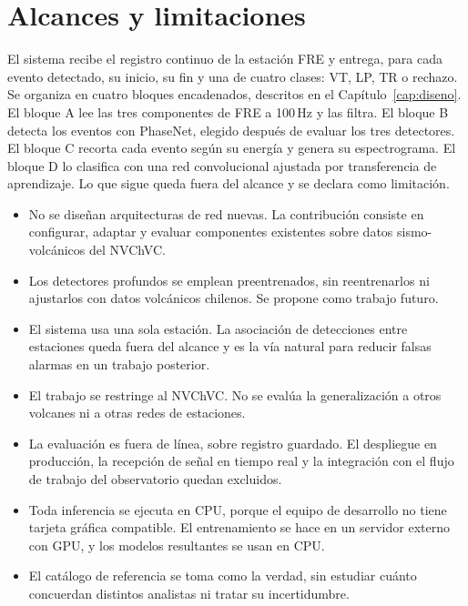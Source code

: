 \section{Alcances y limitaciones}
\label{sec:alcances}

El sistema recibe el registro continuo de la estación FRE y entrega, para cada
evento detectado, su inicio, su fin y una de cuatro clases: VT, LP, TR o
rechazo. Se organiza en cuatro bloques encadenados, descritos en el
Capítulo~\ref{cap:diseno}. El bloque A lee las tres componentes de FRE a
100\,Hz y las filtra. El bloque B detecta los eventos con PhaseNet, elegido
después de evaluar los tres detectores. El bloque C recorta cada evento según
su energía y genera su espectrograma. El bloque D lo clasifica con una red
convolucional ajustada por transferencia de aprendizaje. Lo que sigue queda
fuera del alcance y se declara como limitación.

\begin{itemize}
    \item No se diseñan arquitecturas de red nuevas. La contribución consiste en
    configurar, adaptar y evaluar componentes existentes sobre datos
    sismo-volcánicos del NVChVC.
    \item Los detectores profundos se emplean preentrenados, sin reentrenarlos
    ni ajustarlos con datos volcánicos chilenos. Se propone como trabajo futuro.
    \item El sistema usa una sola estación. La asociación de detecciones entre
    estaciones queda fuera del alcance y es la vía natural para reducir falsas
    alarmas en un trabajo posterior.
    \item El trabajo se restringe al NVChVC. No se evalúa la generalización a
    otros volcanes ni a otras redes de estaciones.
    \item La evaluación es fuera de línea, sobre registro guardado. El
    despliegue en producción, la recepción de señal en tiempo real y la
    integración con el flujo de trabajo del observatorio quedan excluidos.
    \item Toda inferencia se ejecuta en CPU, porque el equipo de desarrollo no
    tiene tarjeta gráfica compatible. El entrenamiento se hace en un servidor
    externo con GPU, y los modelos resultantes se usan en CPU.
    \item El catálogo de referencia se toma como la verdad, sin estudiar cuánto
    concuerdan distintos analistas ni tratar su incertidumbre.
\end{itemize}

